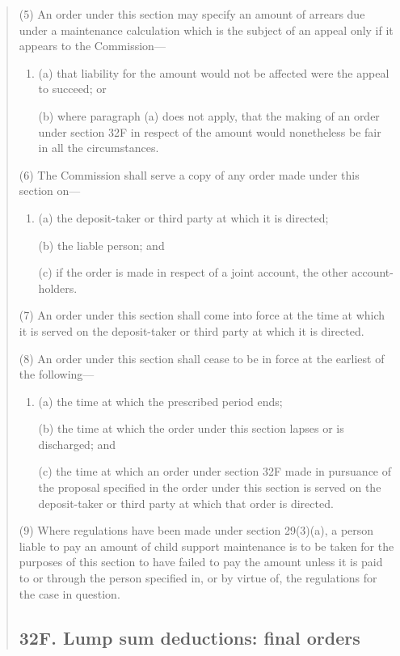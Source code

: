 \documentclass[a4paper]{article}
\begin{document}
\begin{quotation}
(5) An order under this section may specify an amount of arrears due under a maintenance calculation which is the subject of an appeal only if it appears to the Commission---
\begin{enumerate}\item[]
(a) that liability for the amount would not be affected were the appeal to succeed; or

(b) where paragraph (a) does not apply, that the making of an order under section 32F in respect of the amount would nonetheless be fair in all the circumstances.
\end{enumerate}

(6) The Commission shall serve a copy of any order made under this section on---
\begin{enumerate}\item[]
(a)
the deposit-taker or third party at which it is directed;

(b)
the liable person; and

(c)
if the order is made in respect of a joint account, the other account-holders.
\end{enumerate}

(7) An order under this section shall come into force at the time at which it is served on the deposit-taker or third party at which it is directed.

(8) An order under this section shall cease to be in force at the earliest of the following---
\begin{enumerate}\item[]
(a)
the time at which the prescribed period ends;

(b)
the time at which the order under this section lapses or is discharged; and

(c)
the time at which an order under section 32F made in pursuance of the proposal specified in the order under this section is served on the deposit-taker or third party at which that order is directed.
\end{enumerate}

(9) Where regulations have been made under section 29(3)(a), a person liable to pay an amount of child support maintenance is to be taken for the purposes of this section to have failed to pay the amount unless it is paid to or through the person specified in, or by virtue of, the regulations for the case in question.

\subsection*{32F. Lump sum deductions: final orders}


\end{quotation}
\end{document}
